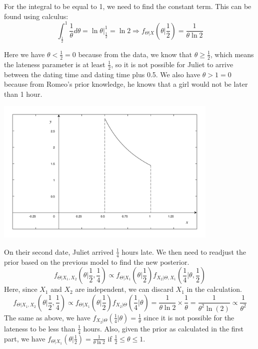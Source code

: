 \begin{eg}
  For the integral to be equal to 1, we need to find the constant term. This can be found using calculus: 
  \[
    \int_\frac{1}{2} ^1 \dfrac{1}{\theta} d \theta= \ln \theta \Big|_{\frac{1}{2}}^1 = \ln 2 \Longrightarrow f_{\Theta \vert X} (\theta \vert \dfrac{1}{2}) = \dfrac{1}{\theta \ln 2}
  \]

  \begin{minipage}{0.5\textwidth}
    Here we have \(\theta < \frac{1}{2} = 0\) because from the data, we know that \(\theta \geq \frac{1}{2}\), which means the lateness parameter is at least \(\frac{1}{2}\), so it is not possible for Juliet to arrive between the dating time and dating time plus 0.5. We also have \(\theta > 1 = 0\) because from Romeo's prior knowledge, he knows that a girl would not be later than 1 hour.
  \end{minipage}
  \begin{minipage}{0.5\textwidth}
    \centering
    \includegraphics[width=0.8\textwidth]{Figures/Romeo_model.pdf}
  \end{minipage}

  On their second date, Juliet arrived \(\frac{1}{4}\) hours late. We then need to readjust the prior based on the previous model to find the new posterior.
  \[
    f_{\Theta \vert X_1, X_2} \left(\theta \Big| \dfrac{1}{2}, \dfrac{1}{4}\right) \propto f_{\Theta \vert X_1} \left(\theta \Big| \dfrac{1}{2}\right) f_{X_2 \vert \Theta, X_1}\left(\dfrac{1}{4} \Big| \theta, \frac{1}{2}\right)
  \]
  Here, since \(X_1\) and \(X_2\) are independent, we can discard \(X_1\) in the calculation.
  \[
    f_{\Theta \vert X_1, X_2} \left(\theta \Big| \dfrac{1}{2}, \dfrac{1}{4}\right) \propto f_{\Theta \vert X_1} \left(\theta \Big| \dfrac{1}{2}\right) f_{X_2 \vert \Theta}\left(\dfrac{1}{4} \Big| \theta\right) = \dfrac{1}{\theta \ln 2} \times \dfrac{1}{\theta} = \dfrac{1}{\theta^{2} \ln{(2)}} \propto \dfrac{1}{\theta^2}
  \]
  The same as above, we have \(f_{X_2 \vert \Theta} (\frac{1}{4} \vert \theta) = \frac{1}{\theta}\) since it is not possible for the lateness to be less than \(\frac{1}{4}\) hours. Also, given the prior as calculated in the first part, we have \(f_{\Theta \vert X_1} (\theta \vert \frac{1}{2}) = \frac{1}{\theta \ln 2}\) if \(\frac{1}{2} \leq \theta \leq 1\).


\end{eg}
